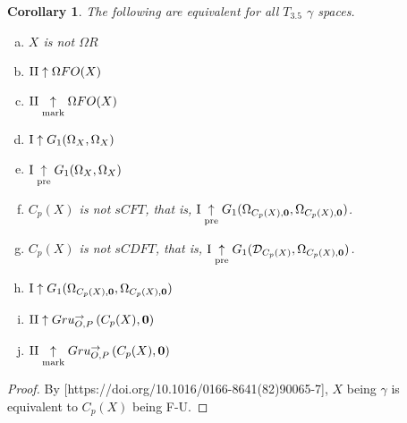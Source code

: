 \documentclass[11pt]{article}
\theoremstyle{plain}
\newtheorem{corollary}[theorem]{Corollary}
\theoremstyle{definition}
\theoremstyle{remark}
\theoremstyle{plain}
\theoremstyle{definition}
\theoremstyle{remark}
\begin{document}
\begin{corollary}
The following are equivalent for all \(T_{3.5}\) \(\gamma\) spaces.
\begin{enumerate}[a)]
\item \(X\) is not \(\Omega R\)
\item \(\mathrm{II}\uparrow \Omega FO(X)\)
\item \(\mathrm{II}\underset{\text{mark}}{\uparrow} \Omega FO(X)\)
\item \(\mathrm{I}\uparrow G_1(\Omega_X,\Omega_X)\)
\item \(\mathrm{I}\underset{\text{pre}}{\uparrow} G_1(\Omega_X,\Omega_X)\)
\item \(C_p(X)\) is not \(sCFT\), that is, 
  \(\mathrm{I}\underset{\text{pre}}{\uparrow} G_{1}(\Omega_{C_p(X),\mathbf 0},\Omega_{C_p(X),\mathbf 0})\).
\item \(C_p(X)\) is not \(sCDFT\), that is,
  \(\mathrm{I}\underset{\text{pre}}{\uparrow} G_{1}(\mathcal{D}_{C_p(X)},\Omega_{C_p(X),\mathbf 0})\).
\item \(\mathrm{I}\uparrow G_{1}(\Omega_{C_p(X),\mathbf 0},\Omega_{C_p(X),\mathbf 0})\)
\item \(\mathrm{II}\uparrow Gru_{O,P}^{\to}\left({C_p(X)},{\mathbf 0}\right)\)
\item \(\mathrm{II}\underset{\text{mark}}{\uparrow}Gru_{O,P}^{\to}\left({C_p(X)},{\mathbf 0}\right)\)
\end{enumerate}
\end{corollary}
\begin{proof}
By [https://doi.org/10.1016/0166-8641(82)90065-7],
\(X\) being \(\gamma\) is equivalent to \(C_p(X)\) being F-U.
\end{proof}


  
  
\end{document}

